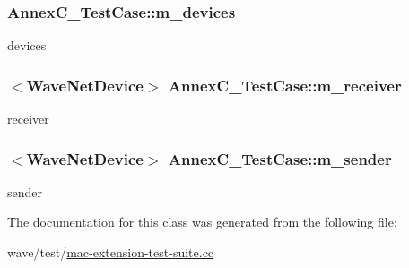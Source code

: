 \subsubsection[{\texorpdfstring{m\+\_\+devices}{m_devices}}]{ Annex\+C\+\_\+\+Test\+Case\+::m\+\_\+devices\hspace{0.3cm}{\ttfamily [private]}}\hypertarget{classAnnexC__TestCase_ab2a998e7df6d23c77fd3a06e203ab925}{}\label{classAnnexC__TestCase_ab2a998e7df6d23c77fd3a06e203ab925}


devices 

\subsubsection[{\texorpdfstring{m\+\_\+receiver}{m_receiver}}]{$<${\bf Wave\+Net\+Device}$>$ Annex\+C\+\_\+\+Test\+Case\+::m\+\_\+receiver\hspace{0.3cm}{\ttfamily [private]}}\hypertarget{classAnnexC__TestCase_a510f45570e19a81906b9de2c586b89f7}{}\label{classAnnexC__TestCase_a510f45570e19a81906b9de2c586b89f7}


receiver 

\subsubsection[{\texorpdfstring{m\+\_\+sender}{m_sender}}]{$<${\bf Wave\+Net\+Device}$>$ Annex\+C\+\_\+\+Test\+Case\+::m\+\_\+sender\hspace{0.3cm}{\ttfamily [private]}}\hypertarget{classAnnexC__TestCase_a277f353900b6dbe1e7850814b9f26cdb}{}\label{classAnnexC__TestCase_a277f353900b6dbe1e7850814b9f26cdb}


sender 



The documentation for this class was generated from the following file\+:\begin{DoxyCompactItemize}
\item 
wave/test/\hyperlink{mac-extension-test-suite_8cc}{mac-\/extension-\/test-\/suite.\+cc}\end{DoxyCompactItemize}
